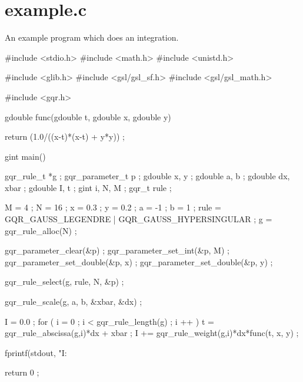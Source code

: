 \section{example.c}
An example program which does an integration.


\begin{DoxyCodeInclude}

#include <stdio.h>
#include <math.h>
#include <unistd.h>

#include <glib.h>
#include <gsl/gsl_sf.h>
#include <gsl/gsl_math.h>

#include <gqr.h>

gdouble func(gdouble t, gdouble x, gdouble y)

{
  return (1.0/((x-t)*(x-t) + y*y)) ;
}

gint main()

{
  gqr_rule_t *g ;
  gqr_parameter_t p ;
  gdouble x, y ;
  gdouble a, b ;
  gdouble dx, xbar ;
  gdouble I, t ;
  gint i, N, M ;
  gqr_t rule ;

  M = 4 ; N = 16 ; 
  x = 0.3 ; y = 0.2 ;
  a = -1 ; b = 1 ;
  rule = GQR_GAUSS_LEGENDRE | GQR_GAUSS_HYPERSINGULAR ;
  g = gqr_rule_alloc(N) ;

  gqr_parameter_clear(&p) ;
  gqr_parameter_set_int(&p, M) ;
  gqr_parameter_set_double(&p, x) ;
  gqr_parameter_set_double(&p, y) ;

  gqr_rule_select(g, rule, N, &p) ;

  gqr_rule_scale(g, a, b, &xbar, &dx) ;

  I = 0.0 ;
  for ( i = 0 ; i < gqr_rule_length(g) ; i ++ ) {
    t = gqr_rule_abscissa(g,i)*dx + xbar ;
    I += gqr_rule_weight(g,i)*dx*func(t, x, y) ;
  }

  fprintf(stdout, "I: %

  return 0 ;
}
\end{DoxyCodeInclude}
 